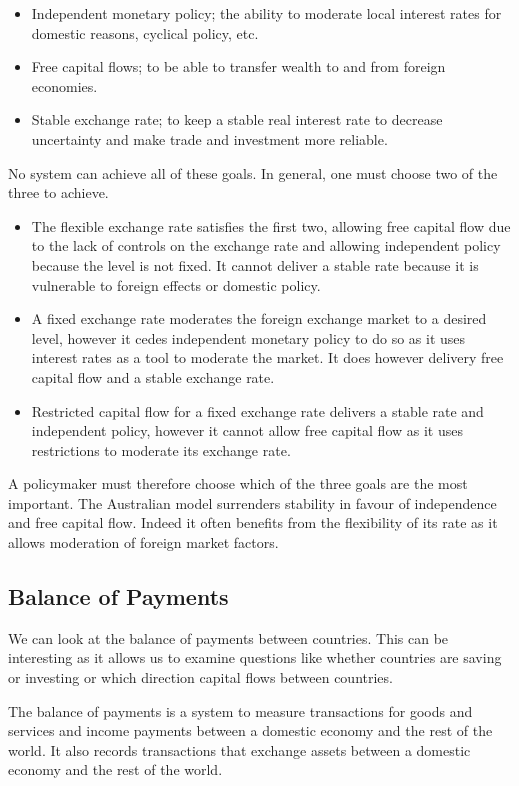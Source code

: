\documentclass[12pt]{report}
\begin{document}
\begin{flushleft}
\begin{itemize}
    \item Independent monetary policy; the ability to moderate local interest
        rates for domestic reasons, cyclical policy, etc.
    \item Free capital flows; to be able to transfer wealth to and from foreign
        economies.
    \item Stable exchange rate; to keep a stable real interest rate to decrease
        uncertainty and make trade and investment more reliable.
\end{itemize}

No system can achieve all of these goals. In general, one must choose two of
the three to achieve.

\begin{itemize}
    \item The flexible exchange rate satisfies the first two, allowing free
        capital flow due to the lack of controls on the exchange rate and
        allowing independent policy because the level is not fixed. It cannot
        deliver a stable rate because it is vulnerable to foreign effects or 
        domestic policy.
    \item A fixed exchange rate moderates the foreign exchange market to a
        desired level, however it cedes independent monetary policy to do so as
        it uses interest rates as a tool to moderate the market.
        It does however delivery free capital flow and a stable exchange rate.
    \item Restricted capital flow for a fixed exchange rate delivers a stable
        rate and independent policy, however it cannot allow free capital flow
        as it uses restrictions to moderate its exchange rate.
\end{itemize}

A policymaker must therefore choose which of the three goals are the most
important. The Australian model surrenders stability in favour of independence
and free capital flow. Indeed it often benefits from the flexibility of its
rate as it allows moderation of foreign market factors.

\subsection*{Balance of Payments}

We can look at the balance of payments between countries. This can be
interesting as it allows us to examine questions like whether countries are
saving or investing or which direction capital flows between countries. \par
The balance of payments is a system to measure transactions for goods and
services and income payments between a domestic economy and the rest of the
world. It also records transactions that exchange assets between a domestic
economy and the rest of the world.


\end{flushleft}
\end{document}
